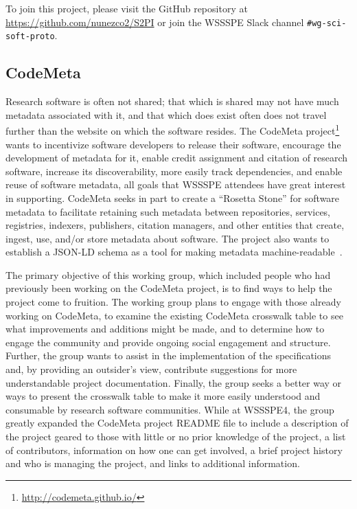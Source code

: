 \documentclass[11pt, oneside]{amsart}
\newcommand{\note}[1]{ {\textcolor{blueish}    { ***Note:      #1 }}}
\begin{document}
To join this project, please visit the GitHub repository at
\url{https://github.com/nunezco2/S2PI} or join the WSSSPE Slack channel
\texttt{\#wg-sci-soft-proto}.


\subsection{CodeMeta}
\label{sec:CodeMeta}


Research software is often not shared; that which is shared may not have much metadata associated with it, and that which does exist often does not travel further than the website on which the software resides. The CodeMeta project\footnote{\url{http://codemeta.github.io/}} wants to incentivize software developers to release their software, encourage the development of metadata for it, enable credit assignment and citation of research software, increase its discoverability, more easily track dependencies, and enable reuse of software metadata, all goals that WSSSPE attendees have great interest in supporting.  CodeMeta seeks in part to create a ``Rosetta Stone'' for software metadata to facilitate retaining such metadata between repositories, services, registries, indexers, publishers, citation managers, and other entities that create, ingest, use, and/or store metadata about software. The project also wants to establish a JSON-LD schema as a tool for making metadata machine-readable~\cite{CodeMeta_schema}.

The primary objective of this working group, which included people who had previously been working on the CodeMeta project, is to find ways to help the project come to fruition.
%
The working group plans to engage with those already working on CodeMeta, to examine the existing CodeMeta crosswalk table to see what improvements and additions might be made, and to determine how to engage the community and provide ongoing social engagement and structure. Further, the group wants to assist in the implementation of the specifications and, by providing an outsider's view, contribute suggestions for more understandable project documentation. Finally, the group seeks a better way or ways to present the crosswalk table to make it more easily understood and consumable by research software communities.
%
While at WSSSPE4, the group greatly expanded the CodeMeta project README file to include a description of the project geared to those with little or no prior knowledge of the project, a list of contributors, information on how one can get involved, a brief project history and who is managing the project, and links to additional information.
\end{document}
